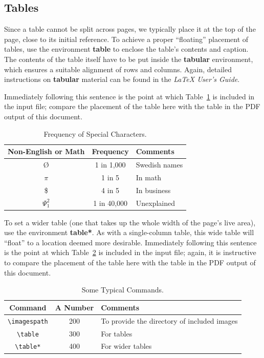 \documentclass[sigconf]{acmart}
\begin{document}
\subsection{Tables}

Since a table cannot be split across pages, we typically place it at the top
of the page, close to its initial reference.  To achieve a proper ``floating''
placement of tables, use the environment \textbf{table} to enclose the table's
contents and caption.  The contents of the table itself have to be put inside
the \textbf{tabular} environment, which ensures a suitable alignment of rows
and columns. Again, detailed instructions on \textbf{tabular} material can be
found in the \emph{\LaTeX{} User's Guide}.

Immediately following this sentence is the point at which
Table~\ref{tab:table1} is included in the input file; compare the placement of
the table here with the table in the PDF output of this document.

\begin{table}
    \centering
    \caption{Frequency of Special Characters.}
    \label{tab:table1}
    \begin{tabular}{ccl}
        \toprule
        Non-English or Math&Frequency&Comments\\
        \midrule
        \O & 1 in 1,000& Swedish names\\
        $\pi$ & 1 in 5& In math\\ 
        \$ & 4 in 5 & In business\\ 
        $\Psi^2_1$ & 1 in 40,000& Unexplained\\
        \bottomrule
    \end{tabular}
\end{table}

To set a wider table (one that takes up the whole width of the page's live
area), use the environment \textbf{table*}.  As with a single-column table,
this wide table will ``float'' to a location deemed more desirable.
Immediately following this sentence is the point at which
Table~\ref{tab:table2} is included in the input file; again, it is instructive
to compare the placement of the table here with the table in the PDF output of
this document.

\begin{table}
    \centering
    \caption{Some Typical Commands.}
    \label{tab:table2}
    \begin{tabular}{ccl} \hline
        \toprule
        Command&A Number&Comments\\
        \midrule
        \texttt{\textbackslash{}imagespath} & 200 & To provide the directory of included images \\
        \texttt{\textbackslash{}table} & 300 & For tables\\
        \texttt{\textbackslash{}table*} & 400& For wider tables\\
        \bottomrule
    \end{tabular}
\end{table}
\end{document}
